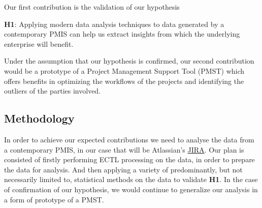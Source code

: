\documentclass[a4paper, 12pt]{article}
\begin{document}
Our first contribution is the validation of our hypothesis 

\textbf{H1}: Applying modern data analysis techniques to data generated by a contemporary PMIS can help us extract insights from which the underlying enterprise will benefit. 

Under the assumption that our hypothesis is confirmed, our second contribution would be a prototype of a Project Management Support Tool (PMST) which offers benefits in optimizing the workflows of the projects and identifying the outliers of the parties involved.

\subsection{Methodology}


In order to achieve our expected contributions we need to analyse the data from a contemporary PMIS, in our case that will be Atlassian's \href{https://www.atlassian.com/software/jira}{JIRA}. Our plan is consisted of firstly performing ECTL processing on the data, in order to prepare the data for analysis. And then applying a variety of predominantly, but not necessarily limited to, statistical methods on the data to validate \textbf{H1}. In the case of confirmation of our hypothesis, we would continue to generalize our analysis in a form of prototype of a PMST.


%
%
%	
%
%	
%
%
\end{document}
